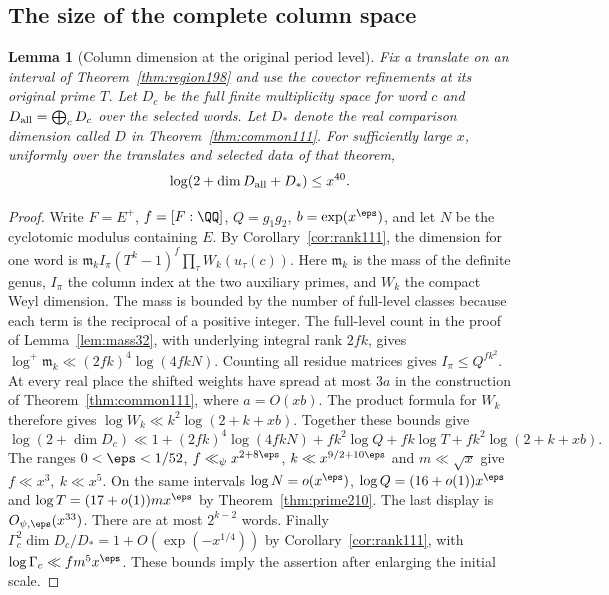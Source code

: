 \documentclass[a4paper,11pt]{article}
\newtheorem{lemma}[proposition]{Lemma}
\theoremstyle{definition}
\theoremstyle{remark}
\numberwithin{equation}{section}
\begin{document}
\subsection{The size of the complete column space}\label{nav:VI-32}
\begin{lemma}[Column dimension at the original period level]
\label{lem:dimension239}
Fix a translate on an interval of Theorem~\ref{thm:region198}
and use the covector refinements at its original prime \(T\).
Let \(D_c\) be the full finite multiplicity space for word \(c\)
and \(D_{\rm all}=\bigoplus_c D_c\) over the selected words.
Let \(D_*\) denote the real comparison dimension called \(D\) in
Theorem~\ref{thm:common111}. For sufficiently large \(x\),
uniformly over the translates and selected data of that theorem,
\[
          \log(2+\dim D_{\rm all}+D_*)\le x^{40}.
\]
\end{lemma}
\begin{proof}
Write \(F=E^+\), \(f=[F:\QQ]\), \(Q=g_1g_2\), \(b=\exp(x^\eps)\),
and let \(N\) be the cyclotomic modulus containing \(E\).
By Corollary~\ref{cor:rank111}, the dimension for one word is
\(\mathfrak m_k I_\pi(T^k-1)^f\prod_\tau W_k(u_\tau(c))\).
Here \(\mathfrak m_k\) is the mass of the definite genus,
\(I_\pi\) the column index at the two auxiliary primes, and
\(W_k\) the compact Weyl dimension. The mass is bounded by the
number of full-level classes because each term is the reciprocal
of a positive integer. The full-level count in the proof of
Lemma~\ref{lem:mass32}, with underlying integral rank \(2fk\),
gives \(\log^+\mathfrak m_k\ll(2fk)^4\log(4fkN)\).
Counting all residue matrices gives \(I_\pi\le Q^{fk^2}\).
At every real place the shifted weights have spread at most
\(3a\) in the construction of Theorem~\ref{thm:common111},
where \(a=O(xb)\). The product formula for \(W_k\) therefore
gives \(\log W_k\ll k^2\log(2+k+xb)\).
Together these bounds give
\[
 \log(2+\dim D_c)\ll
  1+(2fk)^4\log(4fkN)+fk^2\log Q+fk\log T
                    +fk^2\log(2+k+xb).
\]
The ranges \(0<\eps<1/52\), \(f\ll_\psi x^{2+8\eps}\),
\(k\ll x^{9/2+10\eps}\) and \(m\ll\sqrt x\) give
\(f\ll x^3,\ k\ll x^5\). On the same intervals
\(\log N=o(x^\eps)\), \(\log Q=(16+o(1))x^\eps\) and
\(\log T=(17+o(1))m x^\eps\) by Theorem~\ref{thm:prime210}.
The last display is \(O_{\psi,\eps}(x^{33})\).
There are at most \(2^{k-2}\) words. Finally
\(\Gamma_c^2\dim D_c/D_*=1+O(\exp(-x^{1/4}))\) by
Corollary~\ref{cor:rank111}, with
\(\log\Gamma_c\ll f m^5 x^\eps\).
These bounds imply the assertion after enlarging the initial scale.
\end{proof}
\end{document}
